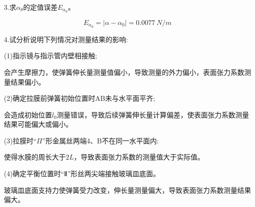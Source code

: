 \documentclass{article}
\begin{document}
3.求$\alpha_{\theta}$的定值误差$E_{\alpha_{\theta}}$。

$$
E_{\alpha_{\theta}}=|\alpha-\alpha_0|=0.0077\ N/m
$$

4.试分析说明下列情况对测量结果的影响:

(1)指示镜与指示管内壁相接触;

会产生摩擦力，使弹簧伸长量测量值偏小，导致测量的外力偏小，表面张力系数测量结果偏小。

(2)确定拉膜前弹簧初始位置时AB未与水平面平齐;

会造成初始位置$l_0$测量错误，导致后续弹簧伸长量计算偏差，使表面张力系数测量结果可能偏大或偏小。

(3)拉膜时“$\Pi$”形金属丝两端4、B不在同一水平面内:

使得水膜的周长大于$2L$，导致表面张力系数的测量值大于实际值。

(4)确定平衡位置时“Ⅱ”形丝两尖端接触玻璃皿底面。

玻璃皿底面支持力使弹簧受力改变，伸长量测量偏大，导致表面张力系数测量结果偏大。
\end{document}
